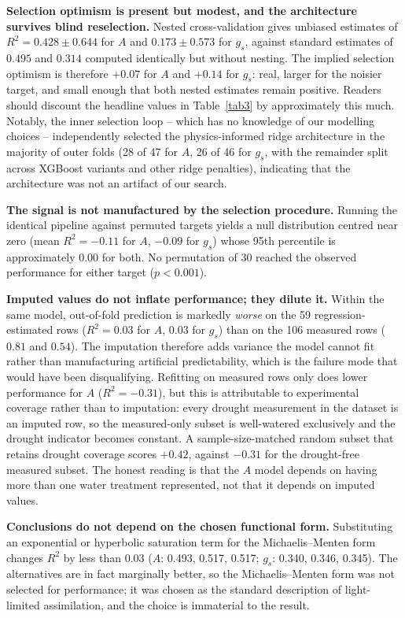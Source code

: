\documentclass[runningheads]{llncs}
\begin{document}
\textbf{Selection optimism is present but modest, and the architecture survives blind reselection.} Nested cross-validation gives unbiased estimates of $R^{2}=0.428\pm0.644$ for $A$ and $0.173\pm0.573$ for $g_s$, against standard estimates of $0.495$ and $0.314$ computed identically but without nesting. The implied selection optimism is therefore $+0.07$ for $A$ and $+0.14$ for $g_s$: real, larger for the noisier target, and small enough that both nested estimates remain positive. Readers should discount the headline values in Table~\ref{tab3} by approximately this much. Notably, the inner selection loop -- which has no knowledge of our modelling choices -- independently selected the physics-informed ridge architecture in the majority of outer folds (28 of 47 for $A$, 26 of 46 for $g_s$, with the remainder split across XGBoost variants and other ridge penalties), indicating that the architecture was not an artifact of our search.

\textbf{The signal is not manufactured by the selection procedure.} Running the identical pipeline against permuted targets yields a null distribution centred near zero (mean $R^{2}=-0.11$ for $A$, $-0.09$ for $g_s$) whose 95th percentile is approximately $0.00$ for both. No permutation of 30 reached the observed performance for either target ($p<0.001$).

\textbf{Imputed values do not inflate performance; they dilute it.} Within the same model, out-of-fold prediction is markedly \emph{worse} on the 59 regression-estimated rows ($R^{2}=0.03$ for $A$, $0.03$ for $g_s$) than on the 106 measured rows ($0.81$ and $0.54$). The imputation therefore adds variance the model cannot fit rather than manufacturing artificial predictability, which is the failure mode that would have been disqualifying. Refitting on measured rows only does lower performance for $A$ ($R^{2}=-0.31$), but this is attributable to experimental coverage rather than to imputation: every drought measurement in the dataset is an imputed row, so the measured-only subset is well-watered exclusively and the drought indicator becomes constant. A sample-size-matched random subset that retains drought coverage scores $+0.42$, against $-0.31$ for the drought-free measured subset. The honest reading is that the $A$ model depends on having more than one water treatment represented, not that it depends on imputed values.

\textbf{Conclusions do not depend on the chosen functional form.} Substituting an exponential or hyperbolic saturation term for the Michaelis--Menten form changes $R^{2}$ by less than 0.03 ($A$: 0.493, 0.517, 0.517; $g_s$: 0.340, 0.346, 0.345). The alternatives are in fact marginally better, so the Michaelis--Menten form was not selected for performance; it was chosen as the standard description of light-limited assimilation, and the choice is immaterial to the result.
\end{document}
